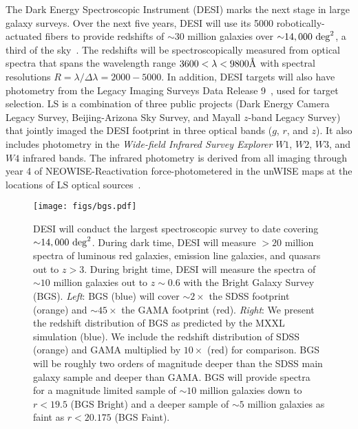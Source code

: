 The Dark Energy Spectroscopic Instrument (DESI) marks the next stage in large
galaxy surveys. 
Over the next five years, DESI will use its 5000 robotically-actuated fibers to
provide redshifts of ${\sim}30$ million galaxies over 
${\sim}14,000~{\rm deg}^2$, a third of the sky~\citep{desicollaboration2016,
desicollaboration2016a}.
The redshifts will be spectroscopically measured from optical spectra that
spans the wavelength range $3600 < \lambda < 9800\AA$ with spectral resolutions
$R = \lambda/\Delta \lambda = 2000 - 5000$.
In addition, DESI targets will also have photometry from the Legacy Imaging
Surveys Data Release 9~\citep[LS;][]{dey2019}, used for target selection. 
LS is a combination of three public projects (Dark Energy Camera Legacy Survey,
Beijing-Arizona Sky Survey, and Mayall $z$-band Legacy Survey) that jointly
imaged the DESI footprint in three optical bands ($g$, $r$, and $z$). 
It also includes photometry in the \emph{Wide-field Infrared Survey Explorer}
$W1$, $W2$, $W3$, and $W4$ infrared bands.
The infrared photometry is derived from all imaging through year 4 of
NEOWISE-Reactivation force-photometered in the unWISE maps at the locations of
LS optical sources~\citep{meisner2017, meisner2017a}.

\begin{figure}
\begin{center}
\texttt{[image: figs/bgs.pdf]} 
\caption{
    DESI will conduct the largest spectroscopic survey to date covering
    ${\sim}14,000~{\rm deg}^2$. 
    During dark time, DESI will measure ${>}20$ million spectra of luminous red
    galaxies, emission line galaxies, and quasars out to $z > 3$.
    During bright time, DESI will measure the spectra of ${\sim}10$ million
    galaxies out to $z{\sim}0.6$ with the Bright Galaxy Survey (BGS).
    {\em Left}: BGS (blue) will cover ${\sim}2\times$ the SDSS footprint
    (orange) and ${\sim}45\times$ the GAMA footprint (red).
    {\em Right}: We present the redshift distribution of BGS as predicted by
    the MXXL simulation (blue). 
    We include the redshift distribution of SDSS (orange) and GAMA multiplied
    by $10\times$ (red) for comparison. 
    BGS will be roughly two orders of magnitude deeper than the SDSS main
    galaxy sample and deeper than GAMA.
    BGS will provide spectra for a magnitude limited sample of ${\sim}10$
    million galaxies down to $r < 19.5$ (BGS Bright) and a deeper sample of
    ${\sim 5}$ million galaxies as faint as $r < 20.175$ (BGS Faint).
}
\label{fig:bgs}
\end{center}
\end{figure}

